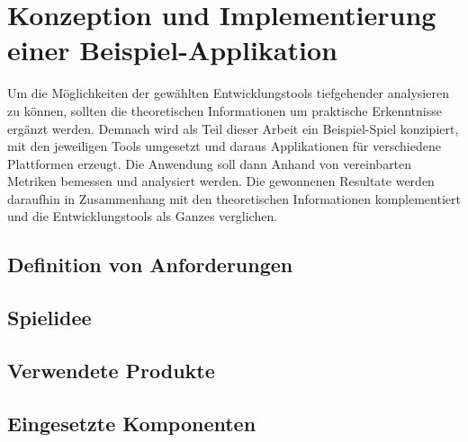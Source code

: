 

\chapter{Konzeption und Implementierung einer Beispiel-Applikation}
Um die Möglichkeiten der gewählten Entwicklungstools tiefgehender analysieren zu können, sollten die theoretischen Informationen um praktische Erkenntnisse ergänzt werden. Demnach wird als Teil dieser Arbeit ein Beispiel-Spiel konzipiert, mit den jeweiligen Tools umgesetzt und daraus Applikationen für verschiedene Plattformen erzeugt. Die Anwendung soll dann Anhand von vereinbarten Metriken bemessen und analysiert werden. Die gewonnenen Resultate werden daraufhin in Zusammenhang mit den theoretischen Informationen komplementiert und die Entwicklungstools als Ganzes verglichen. 

\section{Definition von Anforderungen}
\section{Spielidee}
\section{Verwendete Produkte}
\section{Eingesetzte Komponenten}

